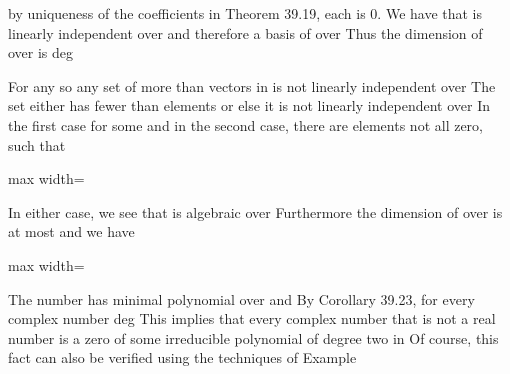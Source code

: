 \documentclass[11pt,oneside]{article}
\begin{document}
\begin{BookBody}
\noindent by uniqueness of the coefficients in Theorem 39.19, each  is 0. We have that  is linearly independent over  and therefore a basis of  over  Thus the dimension of  over  is  deg

For any  so any set of more than  vectors in  is not linearly independent over  The set  either has fewer than  elements or else it is not linearly independent over  In the first case for some  and in the second case, there are elements  not all zero, such that

\begin{center}\begin{adjustbox}{max width=\linewidth}\end{adjustbox}\end{center}

\noindent In either case, we see that \BookInline{\beta } is algebraic over  Furthermore the dimension of  over  is at most  and we have

\begin{center}\begin{adjustbox}{max width=\linewidth}\end{adjustbox}\end{center} \BookEnd{\blacklozenge}

 The number  has minimal polynomial  over  and  By Corollary 39.23, for every complex number \BookInline{\beta,\allowbreak } deg This implies that every complex number that is not a real number is a zero of some irreducible polynomial of degree two in  Of course, this fact can also be verified using the techniques of Example \BookEnd{\blacktriangle}

\end{BookBody}
\end{document}

